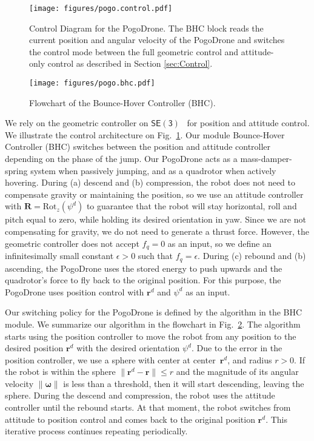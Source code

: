 \documentclass[letterpaper,10pt,conference]{ieeeconf}
\newcommand{\brian}[1]{{\color{brown}#1}}
\begin{document}
\begin{figure}[t]
    \centering
    {\texttt{[image: figures/pogo.control.pdf]}
    \caption{Control Diagram for the PogoDrone. The BHC block reads the current position and angular velocity of the PogoDrone and switches the control mode between the full geometric control and attitude-only control as described in Section \ref{sec:Control}. 
    }
    \vspace{-1em}
    \label{fig:Control}}
\end{figure}
\begin{figure}[b]
\centering
    \texttt{[image: figures/pogo.bhc.pdf]}
    \caption{Flowchart of the Bounce-Hover Controller (BHC).}
    \label{fig:flowchart}
\end{figure}
We rely on the geometric  controller on $\mathsf{SE(3)}$~\cite{5717652, 5980409} for position and attitude control. We illustrate the control architecture on Fig.~\ref{fig:Control}.
Our module Bounce-Hover Controller (BHC) switches between the position and attitude controller depending on the phase of the jump. Our PogoDrone acts as a mass-damper-spring system when passively jumping, and as a quadrotor when actively hovering. 
%
During (a) descend and (b) compression, the robot does not need to compensate gravity or maintaining the position, so we use an attitude controller with $\boldsymbol{R}=\text{Rot}_z(\psi^d)$ to guarantee that the robot will stay horizontal, roll and pitch equal to zero, while holding its desired orientation in yaw.
Since we are not compensating for gravity, we do not need to generate a thrust force.
However, the geometric controller does not accept $f_q=0$ as an input, so we define an infinitesimally small constant  $\epsilon>0$ such that $f_q=\epsilon$.
%
During (c) rebound and (b) ascending, the PogoDrone uses the stored energy to push upwards 
and the quadrotor's force to fly back to the original position. For this purpose, the PogoDrone uses position control with $\boldsymbol{r}^d$ and $\psi^d$ as an input.

Our switching policy for the PogoDrone is defined by the algorithm in the BHC module.
We summarize our algorithm in the flowchart in Fig.~\ref{fig:flowchart}. 
The algorithm starts using the position controller to move the robot from any position to the desired position $\boldsymbol{r}^d$ with the desired orientation $\psi^d$.
%
Due to the error in the position controller, we use a sphere with center at center~$\boldsymbol{r}^d$, and radius $r>0$.
If the robot is within the sphere $\|\boldsymbol{r}^d-\boldsymbol{r}\|\leq r$ and the magnitude of its  angular velocity  $\|\boldsymbol{\omega}\|$ is less than a threshold, then it will start descending, leaving the sphere.
During the descend and compression, the robot uses the attitude controller until the rebound starts. At that moment, the robot switches from attitude to position control and comes back to the original position $\boldsymbol{r}^d$. This iterative process continues repeating periodically.
\end{document}
